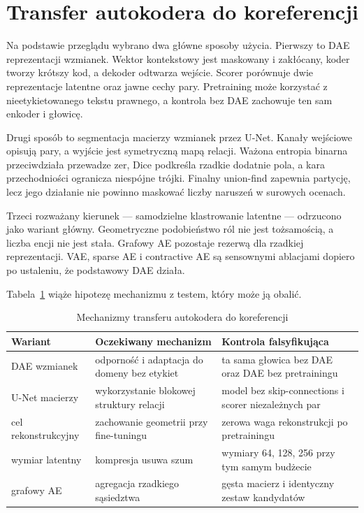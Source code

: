 \section{Transfer autokodera do koreferencji}
\label{sec:transfer-ae}

Na podstawie przeglądu wybrano dwa główne sposoby użycia. Pierwszy to DAE reprezentacji wzmianek. Wektor kontekstowy jest maskowany i zakłócany, koder tworzy krótszy kod, a dekoder odtwarza wejście. Scorer porównuje dwie reprezentacje latentne oraz jawne cechy pary. Pretraining może korzystać z nieetykietowanego tekstu prawnego, a kontrola bez DAE zachowuje ten sam enkoder i głowicę.

Drugi sposób to segmentacja macierzy wzmianek przez U-Net. Kanały wejściowe opisują pary, a wyjście jest symetryczną mapą relacji. Ważona entropia binarna przeciwdziała przewadze zer, Dice podkreśla rzadkie dodatnie pola, a kara przechodniości ogranicza niespójne trójki. Finalny union-find zapewnia partycję, lecz jego działanie nie powinno maskować liczby naruszeń w surowych ocenach.

Trzeci rozważany kierunek --- samodzielne klastrowanie latentne --- odrzucono jako wariant główny. Geometryczne podobieństwo ról nie jest tożsamością, a liczba encji nie jest stała. Grafowy AE pozostaje rezerwą dla rzadkiej reprezentacji. VAE, sparse AE i contractive AE są sensownymi ablacjami dopiero po ustaleniu, że podstawowy DAE działa.

Tabela~\ref{tab:transfer-ae-coref} wiąże hipotezę mechanizmu z testem, który może ją obalić.

\begin{table}[htbp]
  \centering
  \caption{Mechanizmy transferu autokodera do koreferencji}
  \label{tab:transfer-ae-coref}
  \begin{tabular}{p{}p{}p{}}
    \toprule
    Wariant & Oczekiwany mechanizm & Kontrola falsyfikująca \\
    \midrule
    DAE wzmianek & odporność i adaptacja do domeny bez etykiet & ta sama głowica bez DAE oraz DAE bez pretrainingu \\
    U-Net macierzy & wykorzystanie blokowej struktury relacji & model bez skip-connections i scorer niezależnych par \\
    cel rekonstrukcyjny & zachowanie geometrii przy fine-tuningu & zerowa waga rekonstrukcji po pretrainingu \\
    wymiar latentny & kompresja usuwa szum & wymiary 64, 128, 256 przy tym samym budżecie \\
    grafowy AE & agregacja rzadkiego sąsiedztwa & gęsta macierz i identyczny zestaw kandydatów \\
    \bottomrule
  \end{tabular}
\end{table}

